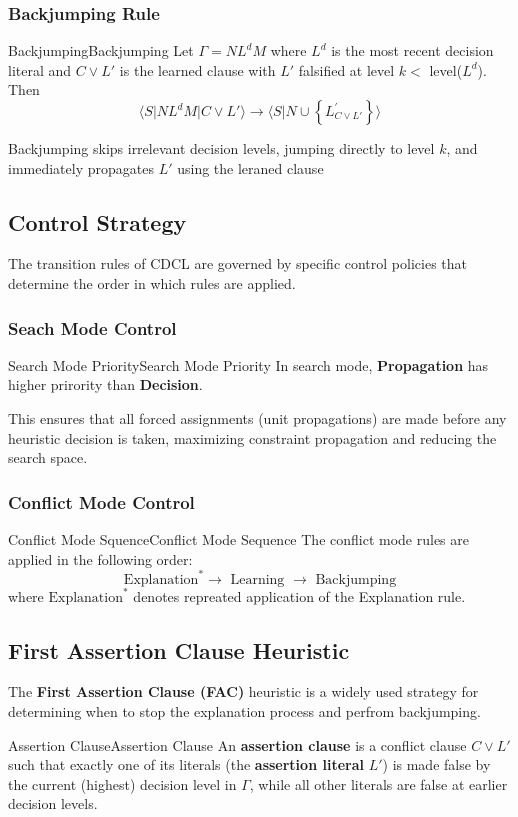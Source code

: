 \documentclass[a4paper]{article}
\theoremstyle{definition}
\begin{document}
\subsubsection{Backjumping Rule}
\begin{definition}{Backjumping}{Backjumping}
Let \( \varGamma = NL^dM \) where \( L^d \) is the most recent decision literal and \( C \vee L' \) is the learned 
clause with \( L' \) falsified at level \( k < \) level($L^d$). Then 
\[
  \langle S \vert NL^dM \vert C \vee L' \rangle \rightarrow \langle S \vert N \cup \left\{ L_{C \vee L'}^{'} \right\} \rangle
\]
\end{definition}
Backjumping skips irrelevant decision levels, jumping directly to level \( k \), and immediately propagates \( L' \) using 
the leraned clause
\subsection{Control Strategy}
The transition rules of CDCL are governed by specific control policies that determine the order in which rules are applied.
\subsubsection{Seach Mode Control}
\begin{definition}{Search Mode Priority}{Search Mode Priority}
In search mode, \textbf{Propagation} has higher prirority than \textbf{Decision}.
\end{definition}
This ensures that all forced assignments (unit propagations) are made before any heuristic decision is taken, maximizing 
constraint propagation and reducing the search space.
\subsubsection{Conflict Mode Control}
\begin{definition}{Conflict Mode Squence}{Conflict Mode Sequence}
The conflict mode rules are applied in the following order:
\[
  \text{Explanation}^* \rightarrow \text{ Learning } \rightarrow \text{ Backjumping}
\]
where \( \text{Explanation}^* \) denotes repreated application of the Explanation rule.
\end{definition}
\subsection{First Assertion Clause Heuristic}
The \textbf{First Assertion Clause (FAC)} heuristic is a widely used strategy for determining when to stop 
the explanation process and perfrom backjumping.
\begin{definition}{Assertion Clause}{Assertion Clause}
An \textbf{assertion clause} is a conflict clause \( C \vee L' \) such that exactly one of its literals (the \textbf{assertion literal} $L'$) is made false by the 
current (highest) decision level in \( \varGamma \), while all other literals are false at earlier decision levels.
\end{definition}
\end{document}
